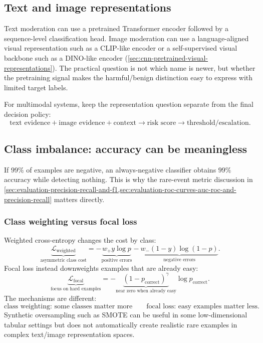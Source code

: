 \subsection{Text and image representations}
\label{sec:moderation-representations}
Text moderation can use a pretrained Transformer encoder followed by a sequence-level classification head.
Image moderation can use a language-aligned visual representation such as a CLIP-like encoder or a self-supervised visual backbone such as a DINO-like encoder (\cref{sec:cnn-pretrained-visual-representations}).
The practical question is not which name is newer, but whether the pretraining signal makes the harmful/benign distinction easy to express with limited target labels.

For multimodal systems, keep the representation question separate from the final decision policy:
\[
\text{text evidence}
+
\text{image evidence}
+
\text{context}
\rightarrow
\text{risk score}
\rightarrow
\text{threshold/escalation}.
\]

\subsection{Class imbalance: accuracy can be meaningless}
\label{sec:moderation-imbalance}
If $99\%$ of examples are negative, an always-negative classifier obtains $99\%$ accuracy while detecting nothing.
This is why the rare-event metric discussion in \cref{sec:evaluation-precision-recall-and-f1,sec:evaluation-roc-curves-auc-roc-and-precision-recall} matters directly.

\subsubsection{Class weighting versus focal loss}
\label{subsec:moderation-focal}
Weighted cross-entropy changes the cost by class:
\[
\underbrace{\mathcal L_{\text{weighted}}}_{\text{asymmetric class cost}}
=
-\underbrace{w_+y\log p}_{\text{positive errors}}
-\underbrace{w_-(1-y)\log(1-p)}_{\text{negative errors}}.
\]
Focal loss instead downweights examples that are already easy:
\[
\boxed{
\underbrace{\mathcal L_{\text{focal}}}_{\text{focus on hard examples}}
=
-\underbrace{(1-p_{\text{correct}})^\gamma}_{\text{near zero when already easy}}
\log p_{\text{correct}}.
}
\]
The mechanisms are different:
\[
\boxed{
\text{class weighting: some classes matter more}
\qquad
\text{focal loss: easy examples matter less}.
}
\]
Synthetic oversampling such as SMOTE can be useful in some low-dimensional tabular settings but does not automatically create realistic rare examples in complex text/image representation spaces.


